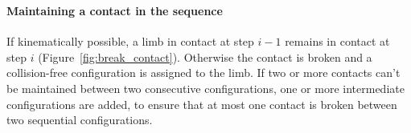 \documentclass[journal]{IEEEtran}
\providecommand{\DIFaddtex}[1]{#1} %
\providecommand{\DIFdeltex}[1]{} %
\providecommand{\DIFaddbegin}{\protect\color{blue}} %
\providecommand{\DIFaddend}{\protect\color{black}} %
\providecommand{\DIFdelbegin}{\protect\cbdelete} %
\providecommand{\DIFdelend}{} %
\providecommand{\DIFadd}[1]{\texorpdfstring{\DIFaddtex{#1}}{#1}} %
\providecommand{\DIFdel}[1]{\texorpdfstring{\DIFdeltex{#1}}{}} %
\begin{document}


\DIFdelbegin \subsubsection{\DIFdel{Maintaining a contact in the sequence}}
\addtocounter{subsubsection}{-1}%
\DIFdelend \DIFaddbegin \paragraph{\DIFadd{Maintaining a contact in the sequence}}
\DIFaddend 

If kinematically possible, a limb in contact at step $i-1$ remains in contact at step $i$ (Figure~\ref{fig:break_contact}). 
Otherwise the contact is broken and a collision-free configuration is assigned to the limb.
If two or more contacts can't be maintained between two consecutive configurations, one or more intermediate configurations are added, to ensure
that at most one contact is broken between two sequential configurations.
\end{document}
